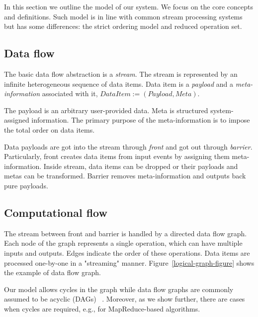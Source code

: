 
\label {fs-model}
In this section we outline the model of our system. We focus on the core concepts and definitions. Such model is in line with common stream processing systems but has some differences: the strict ordering model and reduced operation set.

\subsection{Data flow}

The basic data flow abstraction is a {\it stream}. The stream is represented by an infinite heterogeneous sequence of data items. Data item is a {\it payload} and a {\it meta-information} associated with it, $DataItem := (Payload, Meta)$.

The payload is an arbitrary user-provided data. Meta is structured system-assigned information. The primary purpose of the meta-information is to impose the total order on data items. 

Data payloads are got into the stream through {\it front} and got out through {\it barrier}. Particularly, front creates data items from input events by assigning them meta-information. Inside stream, data items can be dropped or their payloads and metas can be transformed. Barrier removes meta-information and outputs back pure payloads. 



\subsection{Computational flow}

The stream between front and barrier is handled by a directed data flow graph. Each node of the graph represents a single operation, which can have multiple inputs and outputs. Edges indicate the order of these operations. Data items are processed one-by-one in a "streaming" manner. Figure~\ref{logical-graph-figure} shows the example of data flow graph.

Our model allows cycles in the graph while data flow graphs are commonly assumed to be acyclic (DAGs) 
~\cite{Zaharia:2016:ASU:3013530.2934664, Carbone:2017:SMA:3137765.3137777}. Moreover, as we show further, there are cases when cycles are required, e.g., for MapReduce-based algorithms. 

